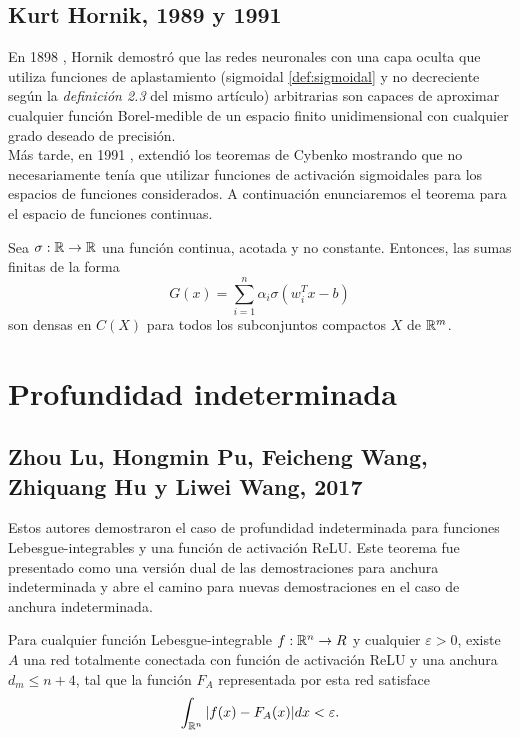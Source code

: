 \subsection{Kurt Hornik, 1989 y 1991}

En 1898 \cite{HornikEtAl89}, Hornik demostró que las redes neuronales con una capa oculta que utiliza funciones de aplastamiento (sigmoidal \autoref{def:sigmoidal} y no decreciente según la \emph{definición 2.3} del mismo artículo) arbitrarias son capaces de aproximar cualquier función Borel-medible de un espacio finito unidimensional con cualquier grado deseado de precisión.\\

Más tarde, en 1991 \cite{Kurt1991251}, extendió los teoremas de Cybenko mostrando que no necesariamente tenía que utilizar funciones de activación sigmoidales para los espacios de funciones considerados. A continuación enunciaremos el teorema para el espacio de funciones continuas.\\

\begin{teorema}
Sea $\sigma: \mathbb{R} \to \mathbb{R}$ una función continua, acotada y no constante. Entonces, las sumas finitas de la forma $$G(x)=\sum_{i=1}^n \alpha_i \sigma(w_i^Tx-b)$$ son densas en $C(X)$ para todos los subconjuntos compactos $X$ de $\mathbb{R}^m$.
\end{teorema}

\section{Profundidad indeterminada}

\subsection{Zhou Lu, Hongmin Pu, Feicheng Wang, Zhiquang Hu y Liwei Wang, 2017}
Estos autores demostraron \cite{2017arXiv170902540L} el caso de profundidad indeterminada para funciones Lebesgue-integrables y una función de activación ReLU. Este teorema fue presentado como una versión dual de las demostraciones para anchura indeterminada y abre el camino para nuevas demostraciones en el caso de anchura indeterminada.

\begin{teorema}
Para cualquier función Lebesgue-integrable $f:\mathbb{R}^n\to R$ y cualquier $\varepsilon>0$, existe $A$ una red totalmente conectada con función de activación ReLU y una anchura $d_m\leq n+4$, tal que la función $F_A$ representada por esta red satisface $$\int_{\mathbb{R}^n}|f(x)-F_A(x)|dx<\varepsilon.$$
\end{teorema}

